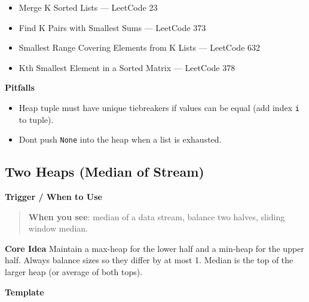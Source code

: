 \documentclass[11pt]{article}
\providecommand{\tightlist}{\setlength{\itemsep}{1pt}\setlength{\parskip}{0pt}}
\begin{document}
\begin{itemize}
\tightlist
\item
  Merge K Sorted Lists --- LeetCode 23
\item
  Find K Pairs with Smallest Sums --- LeetCode 373
\item
  Smallest Range Covering Elements from K Lists --- LeetCode 632
\item
  Kth Smallest Element in a Sorted Matrix --- LeetCode 378
\end{itemize}

\textbf{Pitfalls}

\begin{itemize}
\tightlist
\item
  Heap tuple must have unique tiebreakers if values can be equal (add index \texttt{i} to tuple).
\item
  Don\textquotesingle t push \texttt{None} into the heap when a list is exhausted.
\end{itemize}

\subsection{Two Heaps (Median of Stream)}\label{two-heaps-median-of-stream}

\textbf{Trigger / When to Use}

\begin{quote}
\textbf{When you see}: median of a data stream, balance two halves, sliding window median.
\end{quote}

\textbf{Core Idea}
Maintain a max-heap for the lower half and a min-heap for the upper half. Always balance sizes so they differ by at most 1. Median is the top of the larger heap (or average of both tops).

\textbf{Template}

\end{document}
